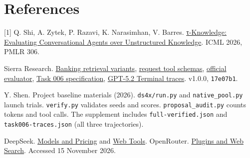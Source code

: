 \documentclass{article}
\begin{document}
\section*{References}
\small
[1] Q. Shi, A. Zytek, P. Razavi, K. Narasimhan, V. Barres. \href{https://proceedings.mlr.press/v306/shi26ah.html}{τ-Knowledge: Evaluating Conversational Agents over Unstructured Knowledge}. ICML 2026, PMLR 306.\par
[2] Sierra Research. \href{https://github.com/sierra-research/tau2-bench/blob/17e07b1da2bbc0cadfddeea36412686e0604127b/src/tau2/domains/banking_knowledge/retrieval.py}{Banking retrieval variants}, \href{https://github.com/sierra-research/tau2-bench/blob/17e07b1da2bbc0cadfddeea36412686e0604127b/src/tau2/utils/llm_utils.py}{request tool schemas}, \href{https://github.com/sierra-research/tau2-bench/blob/17e07b1da2bbc0cadfddeea36412686e0604127b/src/tau2/evaluator/evaluator.py}{official evaluator}, \href{https://github.com/sierra-research/tau2-bench/blob/17e07b1da2bbc0cadfddeea36412686e0604127b/data/tau2/domains/banking_knowledge/tasks/task_006.json}{Task 006 specification}, \href{https://github.com/sierra-research/tau2-bench/blob/17e07b1da2bbc0cadfddeea36412686e0604127b/web/leaderboard/public/submissions/gpt-5-2_sierra_2026-02-26/trajectories/gpt-5.2_high_banking_knowledge_gpt-5.2_4trials.json}{GPT-5.2 Terminal traces}. v1.0.0, \texttt{17e07b1}.\par
[3] Y. Shen. Project baseline materials (2026). \texttt{ds4x/run.py} and \texttt{native\_pool.py} launch trials. \texttt{verify.py} validates seeds and scores. \texttt{proposal\_audit.py} counts tokens and tool calls. The supplement includes \texttt{full-verified.json} and \texttt{task006-traces.json} (all three trajectories).\par
[4] DeepSeek. \href{https://api-docs.deepseek.com/quick_start/pricing/}{Models and Pricing} and \href{https://api-docs.deepseek.com/guides/web_tools/}{Web Tools}. OpenRouter. \href{https://openrouter.ai/docs/guides/features/plugins/overview}{Plugins and Web Search}. Accessed 15 November 2026.\par
\end{document}
